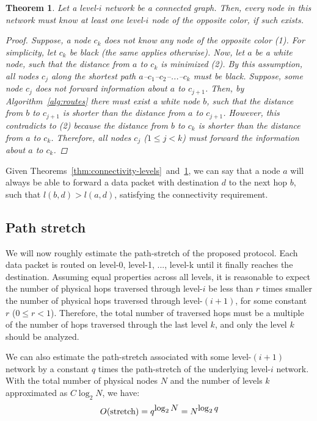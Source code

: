 \documentclass[conference]{IEEEtran}
\newtheorem{thm}{Theorem}
\theoremstyle{definition}
\begin{document}
\begin{thm}
    Let a level-$i$ network be a connected graph. Then, every node in this network must know at least one level-$i$ node of the opposite color, if such exists.

    \begin{proof}
        Suppose, a node $c_k$ does not know any node of the opposite color (1). For simplicity, let $c_k$ be black (the same applies otherwise). Now, let $a$ be a white node, such that the distance from $a$ to $c_k$ is minimized (2). By this assumption, all nodes $c_j$ along the shortest path $a$--$c_1$--$c_2$--...--$c_k$ must be black. Suppose, some node $c_j$ does not forward information about $a$ to $c_{j+1}$. Then, by Algorithm~\ref{alg:routes} there must exist a white node $b$, such that the distance from $b$ to $c_{j+1}$ is shorter than the distance from $a$ to $c_{j+1}$. However, this contradicts to (2) because the distance from $b$ to $c_k$ is shorter than the distance from $a$ to $c_k$. Therefore, all nodes $c_j$ ($1 \le j < k$) must forward the information about $a$ to $c_k$.
    \end{proof}

    \label{thm:connectivity-colors}
\end{thm}

Given Theorems~\ref{thm:connectivity-levels}~and~\ref{thm:connectivity-colors}, we can say that a node $a$ will always be able to forward a data packet with destination $d$ to the next hop $b$, such that $l(b,d) > l(a,d)$, satisfying the connectivity requirement.

\subsection{Path stretch}

We will now roughly estimate the path-stretch of the proposed protocol. Each data packet is routed on level-0, level-1, ..., level-k until it finally reaches the destination. Assuming equal properties across all levels, it is reasonable to expect the number of physical hops traversed through level-$i$ be less than $r$ times smaller the number of physical hops traversed through level-$(i+1)$, for some constant $r$ ($0 \le r < 1$). Therefore, the total number of traversed hops must be a multiple of the number of hops traversed through the last level $k$, and only the level $k$ should be analyzed.

We can also estimate the path-stretch associated with some level-$(i+1)$ network by a constant $q$ times the path-stretch of the underlying level-$i$ network. With the total number of physical nodes $N$ and the number of levels $k$ approximated as $C\log_2 N$, we have:
\begin{equation*}
    O({\rm stretch}) = q^{\displaystyle \log_2 N} = N^{\displaystyle \log_2 q}
\end{equation*}
\end{document}
